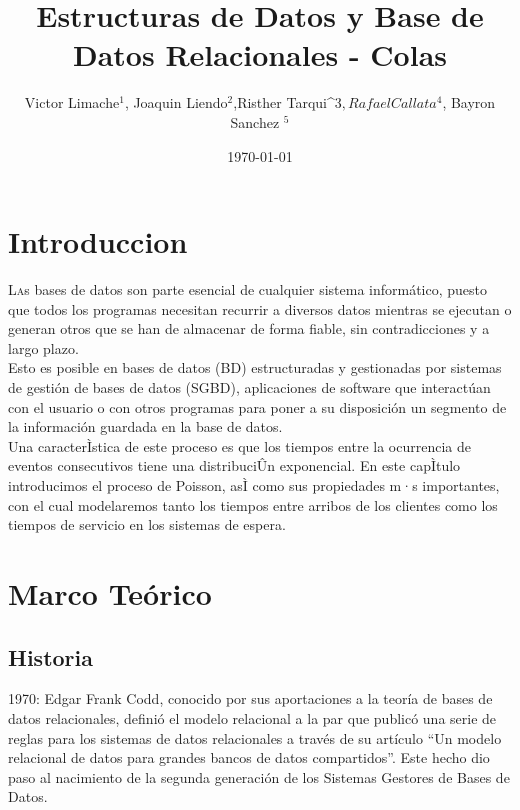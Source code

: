 \documentclass[twoside,twocolumn]{article}
\title{Estructuras de Datos y Base de Datos Relacionales - Colas} %
\author{ 
	Victor Limache$^{1}$, Joaquin Liendo$^{2}$,Risther Tarqui^{3}$,Rafael Callata^{4}$, Bayron Sanchez $^{5}$  }
\date{\today} %
\begin{document}
	
	\maketitle %
	\clearpage
	\section{Introduccion}
	
	\lettrine[nindent=0em,lines=3]{L}as bases de datos son parte esencial de cualquier sistema informático, puesto que todos los programas necesitan recurrir a diversos datos mientras se ejecutan o generan otros que se han de almacenar de forma fiable, sin contradicciones y a largo plazo.  \\
	Esto es posible en bases de datos (BD) estructuradas y gestionadas por sistemas de gestión de bases de datos (SGBD), aplicaciones de software que interactúan con el usuario o con otros programas para poner a su disposición un segmento de la información guardada en la base de datos.  \\
	Una caracterÌstica de este proceso es que los tiempos entre la ocurrencia
	de eventos consecutivos tiene una distribuciÛn exponencial. En este capÌtulo
	introducimos el proceso de Poisson, asÌ como sus propiedades m·s importantes, con el cual modelaremos tanto los tiempos entre arribos de los clientes
	como los tiempos de servicio en los sistemas de espera.\\
	
	
	\section {Marco Teórico}
	\subsection{Historia}
	1970: Edgar Frank Codd, conocido por sus aportaciones a la teoría de bases de datos relacionales, definió el modelo relacional a la par que publicó una serie de reglas para los sistemas de datos relacionales a través de su artículo “Un modelo relacional de datos para grandes bancos de datos compartidos”. Este hecho dio paso al nacimiento de la segunda generación de los Sistemas Gestores de Bases de Datos. \\
	
\end{document}

